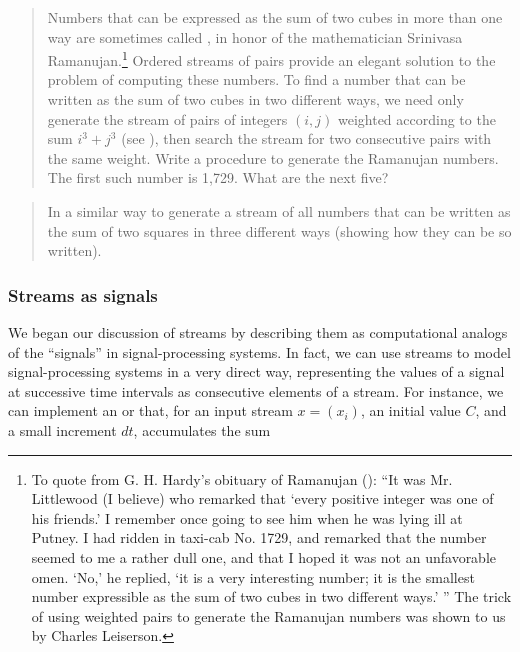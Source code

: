 \begin{quote}
 Numbers that can be expressed as
the sum of two cubes in more than one way are sometimes called
, in honor of the mathematician Srinivasa
Ramanujan.\footnote{To quote from G. H. Hardy's obituary of Ramanujan ():
``It was Mr. Littlewood (I believe) who remarked that `every positive
integer was one of his friends.'  I remember once going to see him when he was
lying ill at Putney.  I had ridden in taxi-cab No. 1729, and remarked that the
number seemed to me a rather dull one, and that I hoped it was not an
unfavorable omen.  `No,' he replied, `it is a very interesting number; it is
the smallest number expressible as the sum of two cubes in two different ways.'
'' The trick of using weighted pairs to generate the Ramanujan numbers was
shown to us by Charles Leiserson.} Ordered streams of pairs provide an elegant
solution to the problem of computing these numbers.  To find a number that can
be written as the sum of two cubes in two different ways, we need only generate
the stream of pairs of integers \( (i, j) \) weighted according to the sum
\( i^3 + j^3 \) (see ), then search the stream for two
consecutive pairs with the same weight.  Write a procedure to generate the
Ramanujan numbers.  The first such number is 1,729.  What are the next five?
\end{quote}

\begin{quote}
 In a similar way to 
generate a stream of all numbers that can be written as the sum of two
squares in three different ways (showing how they can be so written).
\end{quote}

\subsubsection*{Streams as signals}

We began our discussion of streams by describing them as computational analogs
of the ``signals'' in signal-processing systems.  In fact, we can use streams
to model signal-processing systems in a very direct way, representing the
values of a signal at successive time intervals as consecutive elements of a
stream.  For instance, we can implement an  or
 that, for an input stream \( x = (x_i) \), an initial
value \( C \), and a small increment \( dt \), accumulates the sum
\begin{comment}

\begin{example}
           i
          ---
S_i = C + >   x_j dt
          ---
          j=1
\end{example}

\end{comment}

